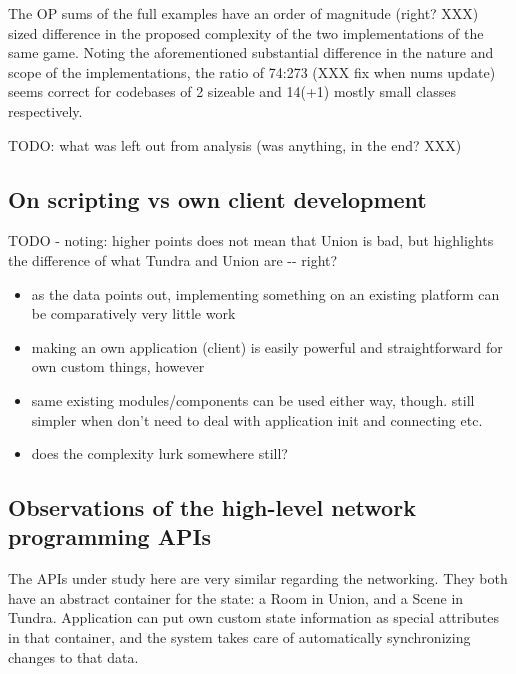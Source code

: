 \documentclass[conference]{IEEEtran}
\begin{document}
The OP sums of the full examples have an order of magnitude
(right? XXX) sized difference in the proposed complexity of the two
implementations of the same game. Noting the aforementioned
substantial difference in the nature and scope of the implementations,
the ratio of 74:273 (XXX fix when nums update) seems correct for
codebases of 2 sizeable and 14(+1) mostly small classes respectively.

TODO: what was left out from analysis (was anything, in the end? XXX)


\subsection{On scripting vs own client development%
  \label{on-scripting-vs-own-client-development}%
}

TODO - noting: higher points does not mean that Union is bad, but
highlights the difference of what Tundra and Union are -{}- right?
%
\begin{itemize}

\item as the data points out, implementing something on an existing
platform can be comparatively very little work

\item making an own application (client) is easily powerful and
straightforward for own custom things, however

\item same existing modules/components can be used either way,
though. still simpler when don't need to deal with application init
and connecting etc.

\item does the complexity lurk somewhere still?

\end{itemize}


\subsection{Observations of the high-level network programming APIs%
  \label{observations-of-the-high-level-network-programming-apis}%
}

The APIs under study here are very similar regarding the
networking. They both have an abstract container for the state: a Room
in Union, and a Scene in Tundra. Application can put own custom state
information as special attributes in that container, and the system
takes care of automatically synchronizing changes to that data.
\end{document}
